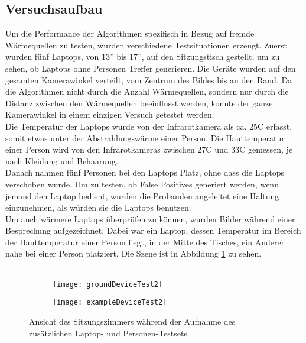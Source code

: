 \subsection{Versuchsaufbau}

Um die Performance der Algorithmen spezifisch in Bezug auf fremde Wärmequellen zu testen, wurden verschiedene Testsituationen erzeugt. Zuerst wurden fünf Laptops, von 13'' bis 17'', auf den Sitzungstisch gestellt, um zu sehen, ob Laptops ohne Personen Treffer generieren. Die Geräte wurden auf den gesamten Kamerawinkel verteilt, vom Zentrum des Bildes bis an den Rand. Da die Algorithmen nicht durch die Anzahl Wärmequellen, sondern nur durch die Distanz zwischen den Wärmequellen beeinflusst werden, konnte der ganze Kamerawinkel in einem einzigen Versuch getestet werden.\\
Die Temperatur der Laptops wurde von der Infrarotkamera als ca. 25\degree C erfasst, somit etwas unter der Abstrahlungswärme einer Person. Die Hauttemperatur einer Person wird von den Infrarotkameras zwischen 27\degree C und 33\degree C gemessen, je nach Kleidung und Behaarung.\\
Danach nahmen fünf Personen bei den Laptops Platz,  ohne dass die Laptops verschoben wurde. Um zu testen, ob False Positives generiert werden, wenn jemand den Laptop bedient, wurden die Probanden angeleitet eine Haltung einzunehmen, als würden sie die Laptops benutzen.\\
Um auch wärmere Laptops überprüfen zu können, wurden Bilder während einer Besprechung aufgezeichnet. Dabei war ein Laptop, dessen Temperatur im Bereich der Hauttemperatur einer Person liegt, in der Mitte des Tisches, ein Anderer nahe bei einer Person platziert. Die Szene ist in Abbildung \ref{fig:exampleDeviceTest2} zu sehen.\\
\\
\begin{figure}[htb]
	\centering
	\begin{subfigure}{.45\linewidth}
		\centering
		\texttt{[image: groundDeviceTest2]}
	\end{subfigure}
	\begin{subfigure}{.45\linewidth}
		\centering
		\texttt{[image: exampleDeviceTest2]}
	\end{subfigure}
	\caption{Ansicht des Sitzungszimmers während der Aufnahme des zusätzlichen Laptop- und Personen-Testsets}
	\label{fig:exampleDeviceTest2}
\end{figure}

